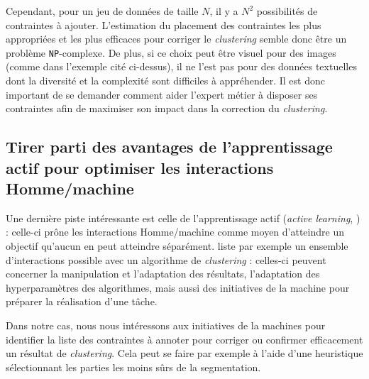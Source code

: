 		Cependant, pour un jeu de données de taille $N$, il y a $N^2$ possibilités de contraintes à ajouter.
		L'estimation du placement des contraintes les plus appropriées et les plus efficaces pour corriger le \textit{clustering} semble donc être un problème \texttt{NP}-complexe.
		De plus, si ce choix peut être visuel pour des images (comme dans l'exemple cité ci-dessus), il ne l'est pas pour des données textuelles dont la diversité et la complexité sont difficiles à appréhender.
		Il est donc important de se demander comment aider l'expert métier à disposer ses contraintes afin de maximiser son impact dans la correction du \textit{clustering}.
		
	
	\subsection{Tirer parti des avantages de l'apprentissage actif pour optimiser les interactions Homme/machine}
	\label{section:3.1.3-INTUITIONS-ORIGINES-APPRENTISSAGE-ACTIF}
	
		Une dernière piste intéressante est celle de l'apprentissage actif (\textit{active learning}, \cite{settles:2010:active-learning-literature}) : celle-ci prône les interactions Homme/machine comme moyen d'atteindre un objectif qu'aucun en peut atteindre séparément.
		\cite{bae-etal:2021:interactive-clustering-comprehensive} liste par exemple un ensemble d'interactions possible avec un algorithme de \textit{clustering} : celles-ci peuvent concerner la manipulation et l'adaptation des résultats, l'adaptation des hyperparamètres des algorithmes, mais aussi des initiatives de la machine pour préparer la réalisation d'une tâche.
		
		Dans notre cas, nous nous intéressons aux initiatives de la machines pour identifier la liste des contraintes à annoter pour corriger ou confirmer efficacement un résultat de \textit{clustering}.
		Cela peut se faire par exemple à l'aide d'une heuristique sélectionnant les parties les moins sûrs de la segmentation.
	
